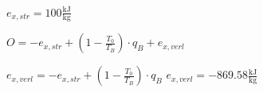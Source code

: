 \( e_{x,str} = 100 \frac{\text{kJ}}{\text{kg}} \)  

\( O = - e_{x,str} + \left( 1 - \frac{T_0}{T_B} \right) \cdot q_B + e_{x,verl} \)  

\( e_{x,verl} = - e_{x,str} + \left( 1 - \frac{T_0}{T_B} \right) \cdot q_B \)  
\( e_{x,verl} = - 869.58 \frac{\text{kJ}}{\text{kg}} \)